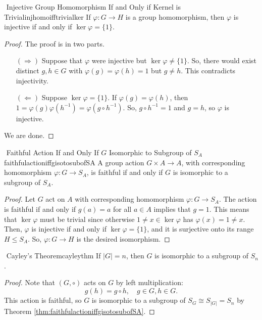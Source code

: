         \begin{lemma}{\Stop\,\,Injective Group Homomorphism If and Only if Kernel is Trivial}{injhomoifftrivialker}
            If \(\varphi:G\to H\) is a group homomorphism, then \(\varphi\) is injective if and only if \(\ker\varphi=\{1\}\).
            \begin{proof}
                The proof is in two parts.
                \begin{enumerate}
                    \item[\((\Rightarrow)\)] Suppose that \(\varphi\) were injective but \(\ker\varphi\neq\{1\}\). So, there would exist distinct \(g,h\in G\) with \(\varphi(g)=\varphi(h)=1\) but \(g\neq h\). This contradicts injectivity.
                    \item[\((\Leftarrow)\)] Suppose \(\ker\varphi=\{1\}\). If \(\varphi(g)=\varphi(h)\), then \(1=\varphi(g)\varphi(h^{-1})=\varphi(g\circ h^{-1})\). So, \(g\circ h^{-1}=1\) and \(g=h\), so \(\varphi\) is injective.
                \end{enumerate}
                We are done.
            \end{proof}
        \end{lemma}
        \begin{theorem}{\Stop\,\,Faithful Action If and Only If \(G\) Isomorphic to Subgroup of \(S_A\)}{faithfulactioniffgisotosubofSA}
            A group action \(G\times A\to A\), with corresponding homomorphism \(\varphi:G\to S_A\), is faithful if and only if \(G\) is isomorphic to a subgroup of \(S_A\).
            \begin{proof}
                Let \(G\) act on \(A\) with corresponding homomorphism \(\varphi:G\to S_A\). The action is faithful if and only if \(g(a)=a\) for all \(a\in A\) implies that \(g=1\). This means that \(\ker\varphi\) must be trivial since otherwise \(1\neq x\in\ker\varphi\) has \(\varphi(x)=1\neq x\). Then, \(\varphi\) is injective if and only if \(\ker\varphi=\{1\}\), and it is surjective onto its range \(H\leq S_A\). So, \(\varphi:G\to H\) is the desired isomorphism.
            \end{proof}
        \end{theorem}
        \begin{corollary}{\Stop\,\,Cayley's Theorem}{cayleythm}
            If \(|G|=n\), then \(G\) is isomorphic to a subgroup of \(S_n\).
            \begin{proof}
                Note that \((G,\circ)\) acts on \(G\) by left multiplication:
                \begin{equation*}
                    g(h)=g\circ h,\quad g\in G, h\in G.
                \end{equation*}
                This action is faithful, so \(G\) is isomorphic to a subgroup of \(S_G\cong S_{|G|}=S_n\) by Theorem \ref{thm:faithfulactioniffgisotosubofSA}.
            \end{proof}
        \end{corollary}
